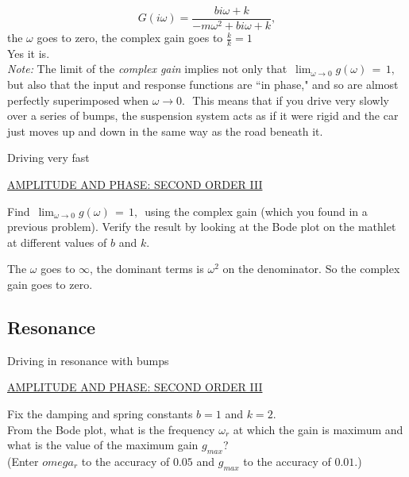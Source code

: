 \begin{equation*}
  G(i \omega) = \frac{bi \omega + k}{-m \omega ^2 + bi \omega + k}, 
\end{equation*}
the $\omega$ goes to zero, the complex gain goes to $\frac{k}{k} = 1$ \\

Yes it is.\\

\emph{Note:} The limit of the \emph{complex gain} implies not only that $\, \lim _{\omega \to 0} g(\omega )\, =\, 1,\,$
but also that the input and response functions are “in phase," and so are almost perfectly superimposed when $\omega \to 0.\, \,$
This means that if you drive very slowly over a series of bumps,
the suspension system acts as if it were rigid and the car just moves up and down in the same way as the road beneath it.

\begin{problem}
  Driving very fast
\end{problem}

\href{http://mathlets.org/mathlets/amplitude-and-phase-2nd-order-iii/}
{AMPLITUDE AND PHASE: SECOND ORDER III}

Find $\, \lim _{\omega \to 0} g(\omega )\, =\, 1,\,$ using the complex gain (which you found in a previous problem).
Verify the result by looking at the Bode plot on the mathlet at different values of $b$ and $k$.

The $\omega$ goes to $\infty$, the dominant terms is $\omega ^2$ on the denominator.
So the complex gain goes to zero.

\clearpage

\subsection{Resonance}

\begin{problem}
  Driving in resonance with bumps
\end{problem}

\href{http://mathlets.org/mathlets/amplitude-and-phase-2nd-order-iii/}
{AMPLITUDE AND PHASE: SECOND ORDER III}

Fix the damping and spring constants $b = 1$ and $k = 2$. \\

From the Bode plot, what is the frequency $\omega _r$ at which the gain is maximum and what is the value of the
maximum gain $g_{max}$?\\
(Enter $omega_ r$ to the accuracy of $0.05$ and $g_ {max}$ to the accuracy of $0.01$.)\\

